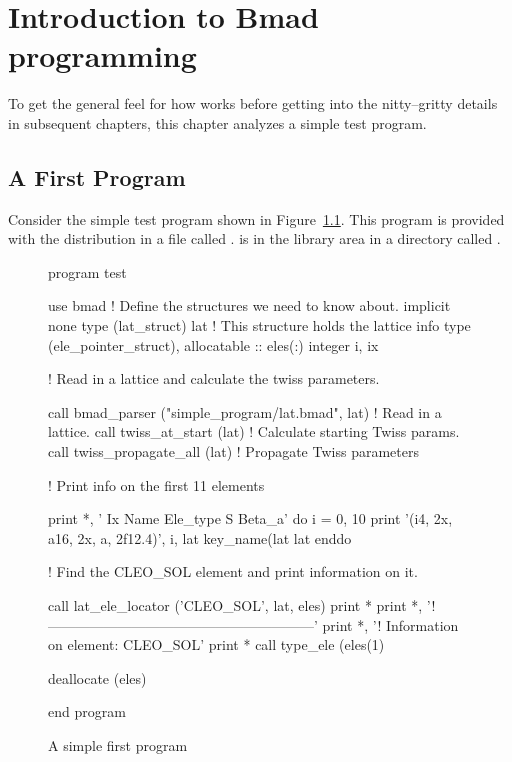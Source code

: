 \chapter{Introduction to Bmad programming}
\label{c:program.info}

To get the general feel for how \bmad works before
getting into the nitty--gritty details in subsequent chapters, this
chapter analyzes a simple test program.

\section{A First Program}

Consider the simple test program shown in Figure~\ref{f:program}.
This program is provided with the \bmad distribution in a file called
.  is in the 
library area in a directory called .

\begin{figure}[ht]
\begin{listing}{1}
program test

  use bmad                 ! Define the structures we need to know about.
  implicit none
  type (lat_struct) lat   ! This structure holds the lattice info
  type (ele_pointer_struct), allocatable :: eles(:)
  integer i, ix

! Read in a lattice and calculate the twiss parameters.

  call bmad_parser ("simple_program/lat.bmad", lat) ! Read in a lattice.
  call twiss_at_start (lat)           ! Calculate starting Twiss params.
  call twiss_propagate_all (lat)      ! Propagate Twiss parameters

! Print info on the first 11 elements

  print *, ' Ix  Name              Ele_type                   S      Beta_a'
  do i = 0, 10
    print '(i4, 2x, a16, 2x, a, 2f12.4)', i, lat%
                    key_name(lat%
                    lat%
  enddo

! Find the CLEO_SOL element and print information on it.

  call lat_ele_locator ('CLEO_SOL', lat, eles)
  print *
  print *, '!---------------------------------------------------------'
  print *, '! Information on element: CLEO_SOL'
  print *
  call type_ele (eles(1)%

  deallocate (eles)

end program
\end{listing}
\caption{A simple first program}
\label{f:program}
\end{figure}

